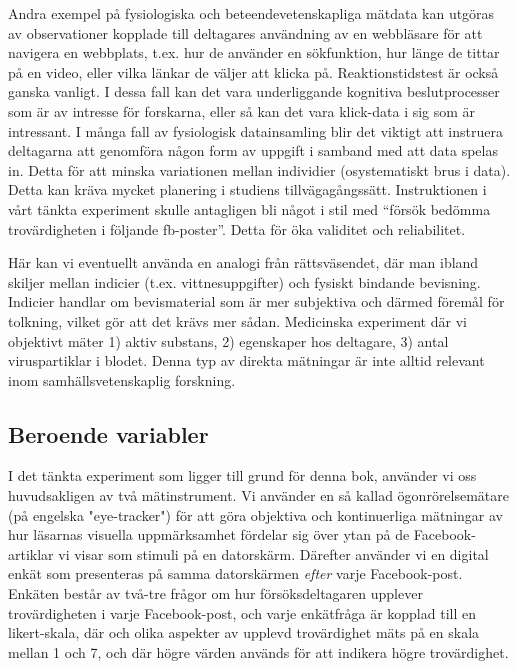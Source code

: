 \documentclass[
]{book}
\begin{document}
Andra exempel på fysiologiska och beteendevetenskapliga mätdata kan utgöras av observationer kopplade till deltagares användning av en webbläsare för att navigera en webbplats, t.ex. hur de använder en sökfunktion, hur länge de tittar på en video, eller vilka länkar de väljer att klicka på. Reaktionstidstest är också ganska vanligt. I dessa fall kan det vara underliggande kognitiva beslutprocesser som är av intresse för forskarna, eller så kan det vara klick-data i sig som är intressant. I många fall av fysiologisk datainsamling blir det viktigt att instruera deltagarna att genomföra någon form av uppgift i samband med att data spelas in. Detta för att minska variationen mellan individier (osystematiskt brus i data). Detta kan kräva mycket planering i studiens tillvägagångssätt. Instruktionen i vårt tänkta experiment skulle antagligen bli något i stil med ``försök bedömma trovärdigheten i följande fb-poster''. Detta för öka validitet och reliabilitet.

Här kan vi eventuellt använda en analogi från rättsväsendet, där man ibland skiljer mellan indicier (t.ex. vittnesuppgifter) och fysiskt bindande bevisning. Indicier handlar om bevismaterial som är mer subjektiva och därmed föremål för tolkning, vilket gör att det krävs mer sådan. Medicinska experiment där vi objektivt mäter 1) aktiv substans, 2) egenskaper hos deltagare, 3) antal viruspartiklar i blodet. Denna typ av direkta mätningar är inte alltid relevant inom samhällsvetenskaplig forskning.

\hypertarget{sub07.3.4}{%
\subsection{Beroende variabler}\label{sub07.3.4}}

I det tänkta experiment som ligger till grund för denna bok, använder vi oss huvudsakligen av två mätinstrument. Vi använder en så kallad ögonrörelsemätare (på engelska "eye-tracker") för att göra objektiva och kontinuerliga mätningar av hur läsarnas visuella uppmärksamhet fördelar sig över ytan på de Facebook-artiklar vi visar som stimuli på en datorskärm. Därefter använder vi en digital enkät som presenteras på samma datorskärmen \emph{efter} varje Facebook-post. Enkäten består av två-tre frågor om hur försöksdeltagaren upplever trovärdigheten i varje Facebook-post, och varje enkätfråga är kopplad till en likert-skala, där och olika aspekter av upplevd trovärdighet mäts på en skala mellan 1 och 7, och där högre värden används för att indikera högre trovärdighet.
\end{document}
